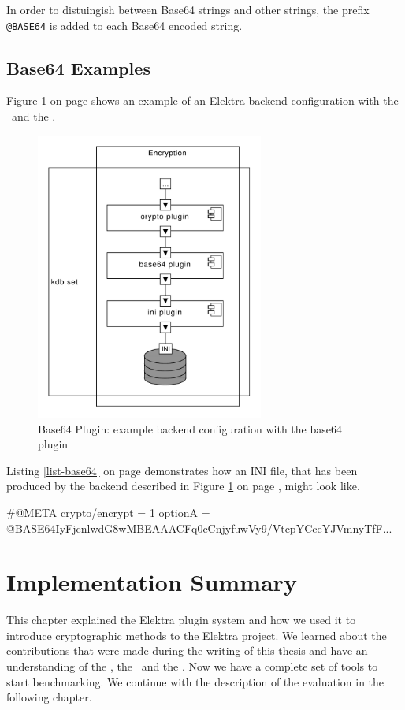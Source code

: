 In order to distuingish between Base64 strings and other strings, the prefix \texttt{@BASE64} is added to each Base64 encoded string. 

\subsection{Base64 Examples}

Figure \ref{impl_base64_overview} on page \pageref{impl_base64_overview} shows an example of an Elektra backend configuration with the \crypto ~and the \base.

\begin{figure}[h]
\center
\caption{Base64 Plugin: example backend configuration with the base64 plugin}
\label{impl_base64_overview}
\includegraphics[width=7.5cm]{umlet-figures/impl_base64_overview.pdf}
\end{figure}

Listing \ref{list-base64} on page \pageref{list-base64} demonstrates how an INI file, that has been produced by the backend described in Figure \ref{impl_base64_overview} on page \pageref{impl_base64_overview}, might look like.

\begin{code}[label=list-base64,caption={Base64 example INI output}]
[section1]
#@META crypto/encrypt = 1
optionA = @BASE64IyFjcnlwdG8wMBEAAACFq0cCnjyfuwVy9/VtcpYCceYJVmnyTfF...
\end{code}

\section{Implementation Summary}

This chapter explained the Elektra plugin system and how we used it to introduce cryptographic methods to the Elektra project.
We learned about the contributions that were made during the writing of this thesis and have an understanding of the \crypto, the \fcrypt ~and the \base.
Now we have a complete set of tools to start benchmarking.
We continue with the description of the evaluation in the following chapter.
